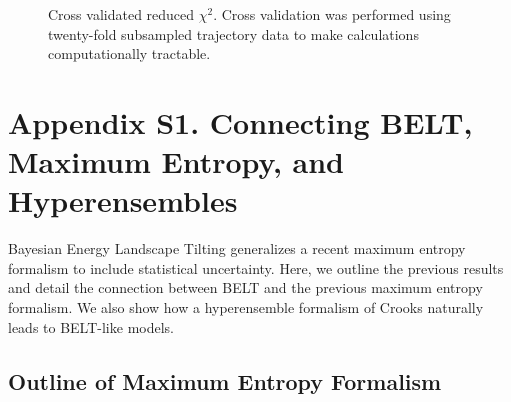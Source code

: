 \documentclass[12pt]{article}
\begin{document}
\begin{figure}

\caption{
Cross validated reduced $\chi^2$.  Cross validation was performed using twenty-fold subsampled trajectory data to make calculations computationally tractable.  
}
\label{figure:cross_val}
\end{figure}


\clearpage

\section*{Appendix S1.  Connecting BELT, Maximum Entropy, and Hyperensembles}

Bayesian Energy Landscape Tilting generalizes a recent maximum entropy formalism \cite{chodera2012} to include statistical uncertainty.  Here, we outline the previous results and detail the connection between BELT and the previous maximum entropy formalism.  We also show how a hyperensemble formalism of Crooks \cite{crooks2007beyond} naturally leads to BELT-like models.

\subsection*{Outline of Maximum Entropy Formalism}
\end{document}
